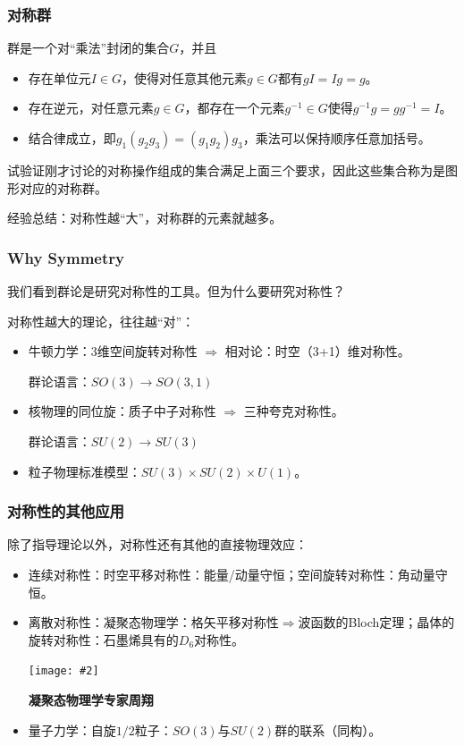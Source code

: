 \documentclass[CJK]{beamer}
\newcommand{\cpic}[2]{
\begin{center}
\texttt{[image: \#2]}
\end{center}
}
\begin{document}
\begin{frame}
\frametitle{\bch 对称群 \ech}
\bch
群是一个对“乘法”封闭的集合$G$，并且
\begin{itemize}
\item 存在单位元$I \in G$，使得对任意其他元素$g \in G$都有$gI = Ig = g$。
\item 存在逆元，对任意元素$g \in G$，都存在一个元素$g^{-1}\in G$使得$g^{-1} g = gg^{-1} = I$。
\item 结合律成立，即$g_1 ( g_2 g_3) = (g_1 g_2) g_3$，乘法可以保持顺序任意加括号。
\end{itemize}
试验证刚才讨论的对称操作组成的集合满足上面三个要求，因此这些集合称为是图形对应的对称群。 
\par
经验总结：对称性越“大”，对称群的元素就越多。

\ech
\end{frame}

\begin{frame}
\frametitle{\bch Why Symmetry \ech}
\bch
我们看到群论是研究对称性的工具。但为什么要研究对称性？
\par
对称性越大的理论，往往越“对”：
\begin{itemize}
\item 牛顿力学：3维空间旋转对称性 $\Rightarrow$ 相对论：时空（3+1）维对称性。
\par
群论语言：$SO(3) \to SO(3,1)$
\item 核物理的同位旋：质子中子对称性 $\Rightarrow$ 三种夸克对称性。
\par
群论语言：$SU(2) \to SU(3)$
\item 粒子物理标准模型：$SU(3) \times SU(2) \times U(1)$。
\end{itemize}

\ech
\end{frame}

\begin{frame}
\frametitle{\bch 对称性的其他应用 \ech}
\bch
除了指导理论以外，对称性还有其他的直接物理效应：

\begin{itemize}
\item 连续对称性：时空平移对称性：能量/动量守恒；空间旋转对称性：角动量守恒。
\item 离散对称性：凝聚态物理学：格矢平移对称性$\Rightarrow$波函数的Bloch定理；晶体的旋转对称性：石墨烯具有的$D_6$对称性。
\cpic{0.2}{zx}
\begin{center}
{\small \bf 凝聚态物理学专家周翔}
\end{center}
\item 量子力学：自旋$1/2$粒子：$SO(3)$与$SU(2)$群的联系（同构）。
\end{itemize}

\ech
\end{frame}
\end{document}

